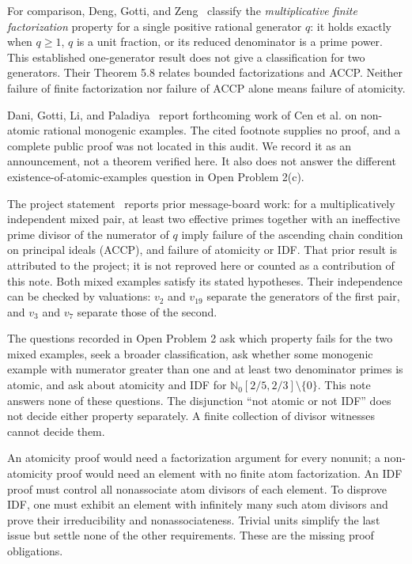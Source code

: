 \documentclass[11pt]{article}
\theoremstyle{definition}
\newcommand{\NN}{\mathbb N}
\begin{document}
For comparison, Deng, Gotti, and Zeng~\cite[Theorem 5.7]{dgz} classify
the \emph{multiplicative finite factorization} property for a single
positive rational generator $q$: it holds exactly when $q\ge1$, $q$
is a unit fraction, or its reduced denominator is a prime power.
This established one-generator result does not give a classification
for two generators. Their Theorem 5.8 relates bounded factorizations
and ACCP. Neither failure of finite factorization nor failure of ACCP
alone means failure of atomicity.

Dani, Gotti, Li, and Paladiya~\cite[Introduction, footnote 1]{dglp}
report forthcoming work of Cen et al. on non-atomic rational monogenic
examples. The cited footnote supplies no proof, and a complete public
proof was not located in this audit. We record it as an announcement,
not a theorem verified here. It also does not answer the different
existence-of-atomic-examples question in Open Problem 2(c).

The project statement~\cite{cm2} reports prior message-board work:
for a multiplicatively independent mixed pair, at least two effective
primes together with an ineffective prime divisor of the numerator of $q$
imply failure of the ascending chain condition on principal ideals (ACCP),
and failure of atomicity or IDF. That prior result is attributed to the
project; it is not reproved here or counted as a contribution of this note.
Both mixed examples satisfy its stated hypotheses. Their independence
can be checked by valuations: $v_2$ and $v_{19}$ separate the generators
of the first pair, and $v_3$ and $v_7$ separate those of the second.

The questions recorded in Open Problem 2 ask which property fails for
the two mixed examples, seek a broader classification, ask whether some
monogenic example with numerator greater than one and at least two
denominator primes is atomic, and ask about atomicity and IDF for
$\NN_0[2/5,2/3]\setminus\{0\}$. This note answers none of these questions.
The disjunction ``not atomic or not IDF'' does not decide either property
separately. A finite collection of divisor witnesses cannot decide them.

An atomicity proof would need a factorization argument for every nonunit;
a non-atomicity proof would need an element with no finite atom
factorization. An IDF proof must control all nonassociate atom divisors of
each element. To disprove IDF, one must exhibit an element with infinitely
many such atom divisors and prove their irreducibility and
nonassociateness. Trivial units simplify the last issue but settle none
of the other requirements. These are the missing proof obligations.
\end{document}
